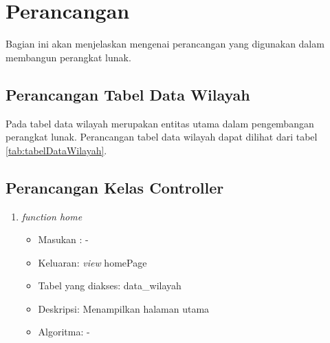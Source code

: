 \chapter{Perancangan}
\label{chap:perancangan}
Bagian ini akan menjelaskan mengenai perancangan yang digunakan dalam membangun perangkat lunak. 


\section{Perancangan Tabel Data Wilayah}
\label{sec:perancanganTabelDataWilayah}
Pada tabel data wilayah merupakan entitas utama dalam pengembangan perangkat lunak. Perancangan tabel data wilayah dapat dilihat dari tabel \ref{tab:tabelDataWilayah}.
\begin{table}[H]
	\centering
	\caption{Rancangan Tabel Data Willayah}
	\label{tab:tabelDataWilayah}
\end{table}


\section{Perancangan Kelas Controller}
\label{sec:perancanganController}
\begin{enumerate}
	\item \textit{function home}
	\begin{itemize}
		\item Masukan : -
		\item Keluaran: \textit{view} homePage
		\item Tabel yang diakses: data\_wilayah
		\item Deskripsi: Menampilkan halaman utama
		\item Algoritma: -
	\end{itemize}
\end{enumerate}


